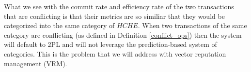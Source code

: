 What we see with the commit rate and efficiency rate of the two transactions that are conflicting is that their metrics are so similiar that they would be categorized into the same category of $HCHE$. When two transactions of the same category are conflicting (as defined in Definition \ref{conflict_ops}) then the system will default to 2PL and will not leverage the prediction-based system of categories. This is the problem that we will address with vector reputation management (VRM).